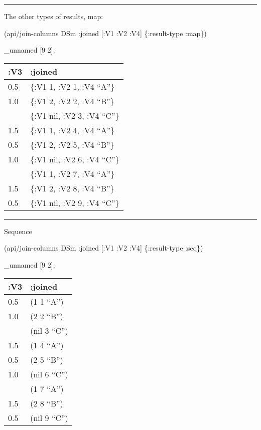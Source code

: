 \documentclass[]{article}
\newenvironment{Shaded}{\begin{snugshade}}{\end{snugshade}}
\newcommand{\AttributeTok}[1]{\textcolor[rgb]{0.77,0.63,0.00}{#1}}
\newcommand{\NormalTok}[1]{#1}
\begin{document}
\begin{center}\rule{0.5\linewidth}{0.5pt}\end{center}

The other types of results, map:

\begin{Shaded}
\begin{Highlighting}[]
\NormalTok{(api/join-columns DSm }\AttributeTok{:joined}\NormalTok{ [}\AttributeTok{:V1} \AttributeTok{:V2} \AttributeTok{:V4}\NormalTok{] \{}\AttributeTok{:result-type} \AttributeTok{:map}\NormalTok{\})}
\end{Highlighting}
\end{Shaded}

\_unnamed {[}9 2{]}:

\begin{longtable}[]{@{}ll@{}}
\toprule
:V3 & :joined\tabularnewline
\midrule
\endhead
0.5 & \{:V1 1, :V2 1, :V4 ``A''\}\tabularnewline
1.0 & \{:V1 2, :V2 2, :V4 ``B''\}\tabularnewline
& \{:V1 nil, :V2 3, :V4 ``C''\}\tabularnewline
1.5 & \{:V1 1, :V2 4, :V4 ``A''\}\tabularnewline
0.5 & \{:V1 2, :V2 5, :V4 ``B''\}\tabularnewline
1.0 & \{:V1 nil, :V2 6, :V4 ``C''\}\tabularnewline
& \{:V1 1, :V2 7, :V4 ``A''\}\tabularnewline
1.5 & \{:V1 2, :V2 8, :V4 ``B''\}\tabularnewline
0.5 & \{:V1 nil, :V2 9, :V4 ``C''\}\tabularnewline
\bottomrule
\end{longtable}

\begin{center}\rule{0.5\linewidth}{0.5pt}\end{center}

Sequence

\begin{Shaded}
\begin{Highlighting}[]
\NormalTok{(api/join-columns DSm }\AttributeTok{:joined}\NormalTok{ [}\AttributeTok{:V1} \AttributeTok{:V2} \AttributeTok{:V4}\NormalTok{] \{}\AttributeTok{:result-type} \AttributeTok{:seq}\NormalTok{\})}
\end{Highlighting}
\end{Shaded}

\_unnamed {[}9 2{]}:

\begin{longtable}[]{@{}ll@{}}
\toprule
:V3 & :joined\tabularnewline
\midrule
\endhead
0.5 & (1 1 ``A'')\tabularnewline
1.0 & (2 2 ``B'')\tabularnewline
& (nil 3 ``C'')\tabularnewline
1.5 & (1 4 ``A'')\tabularnewline
0.5 & (2 5 ``B'')\tabularnewline
1.0 & (nil 6 ``C'')\tabularnewline
& (1 7 ``A'')\tabularnewline
1.5 & (2 8 ``B'')\tabularnewline
0.5 & (nil 9 ``C'')\tabularnewline
\bottomrule
\end{longtable}
\end{document}
